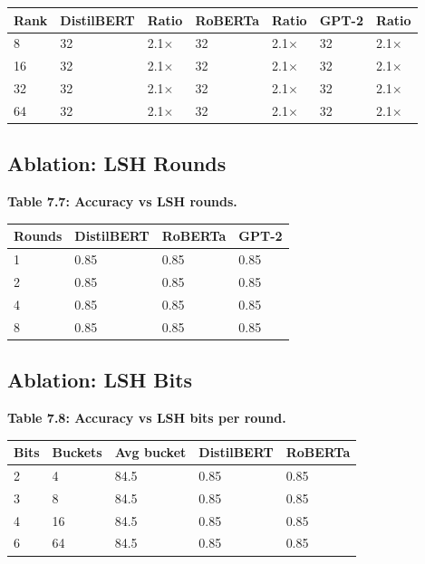 \begin{table}[H]
\centering
\small
\begin{tabular}{lllllll}
\toprule
\textbf{Rank} & \textbf{DistilBERT} & \textbf{Ratio} & \textbf{RoBERTa} & \textbf{Ratio} & \textbf{GPT-2} & \textbf{Ratio} \\
\midrule
8 & 32 & 2.1$\times$ & 32 & 2.1$\times$ & 32 & 2.1$\times$ \\
16 & 32 & 2.1$\times$ & 32 & 2.1$\times$ & 32 & 2.1$\times$ \\
32 & 32 & 2.1$\times$ & 32 & 2.1$\times$ & 32 & 2.1$\times$ \\
64 & 32 & 2.1$\times$ & 32 & 2.1$\times$ & 32 & 2.1$\times$ \\
\bottomrule
\end{tabular}
\end{table}

\subsection{Ablation: LSH Rounds}

\textbf{Table 7.7: Accuracy vs LSH rounds.}

\begin{table}[H]
\centering
\small
\begin{tabular}{llll}
\toprule
\textbf{Rounds} & \textbf{DistilBERT} & \textbf{RoBERTa} & \textbf{GPT-2} \\
\midrule
1 & 0.85 & 0.85 & 0.85 \\
2 & 0.85 & 0.85 & 0.85 \\
4 & 0.85 & 0.85 & 0.85 \\
8 & 0.85 & 0.85 & 0.85 \\
\bottomrule
\end{tabular}
\end{table}

\subsection{Ablation: LSH Bits}

\textbf{Table 7.8: Accuracy vs LSH bits per round.}

\begin{table}[H]
\centering
\small
\begin{tabular}{lllll}
\toprule
\textbf{Bits} & \textbf{Buckets} & \textbf{Avg bucket} & \textbf{DistilBERT} & \textbf{RoBERTa} \\
\midrule
2 & 4 & 84.5 & 0.85 & 0.85 \\
3 & 8 & 84.5 & 0.85 & 0.85 \\
4 & 16 & 84.5 & 0.85 & 0.85 \\
6 & 64 & 84.5 & 0.85 & 0.85 \\
\bottomrule
\end{tabular}
\end{table}

